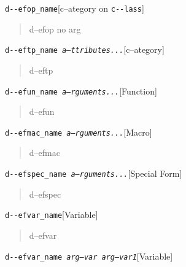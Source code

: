 \documentclass{book}
\begin{document}
\begin{titlepage}
\noindent\texttt{d{-}{-}efop\_name}\hfill[c--ategory on \texttt{c{-}{-}lass}]



%
\begin{quote}
\unskip{\parskip=0pt\noindent}%
d--efop no arg
\end{quote}

\noindent\texttt{d{-}{-}eftp\_name \EmbracOn{}\textnormal{\textsl{a--ttributes...}}\EmbracOff{}}\hfill[c--ategory]



%
\begin{quote}
\unskip{\parskip=0pt\noindent}%
d--eftp
\end{quote}

\noindent\texttt{d{-}{-}efun\_name \EmbracOn{}\textnormal{\textsl{a--rguments...}}\EmbracOff{}}\hfill[Function]



%
\begin{quote}
\unskip{\parskip=0pt\noindent}%
d--efun
\end{quote}

\noindent\texttt{d{-}{-}efmac\_name \EmbracOn{}\textnormal{\textsl{a--rguments...}}\EmbracOff{}}\hfill[Macro]



%
\begin{quote}
\unskip{\parskip=0pt\noindent}%
d--efmac
\end{quote}

\noindent\texttt{d{-}{-}efspec\_name \EmbracOn{}\textnormal{\textsl{a--rguments...}}\EmbracOff{}}\hfill[Special Form]



%
\begin{quote}
\unskip{\parskip=0pt\noindent}%
d--efspec
\end{quote}

\noindent\texttt{d{-}{-}efvar\_name}\hfill[Variable]



%
\begin{quote}
\unskip{\parskip=0pt\noindent}%
d--efvar
\end{quote}

\noindent\texttt{d{-}{-}efvar\_name \EmbracOn{}\textnormal{\textsl{arg--var arg--var1}}\EmbracOff{}}\hfill[Variable]




\end{titlepage}
\end{document}

